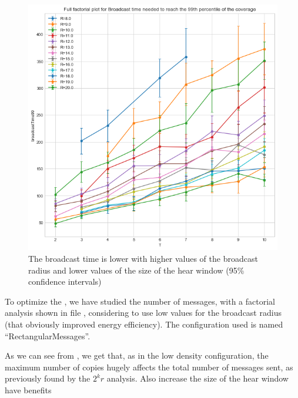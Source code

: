 \begin{figure}
	\centering
	\includegraphics[width=\textwidth]{img/rect/broadcasttime-T-ffplot.png}
	\caption{The broadcast time is lower with higher values of the broadcast
	radius and lower values of the size of the hear window (95\% confidence
	intervals)}\label{fig:recttimeff}
\end{figure}

To optimize the , we have studied the number of
messages, with a factorial analysis shown in file ,
considering to use low values for the broadcast radius (that obviously improved
energy efficiency). The configuration used is named ``RectangularMessages''.

As we can see from , we get that, as in the low
density configuration, the maximum number of copies hugely affects the total
number of messages sent, as previously found by the \(2^{k}r\) analysis. Also
increase the size of the hear window have benefits

